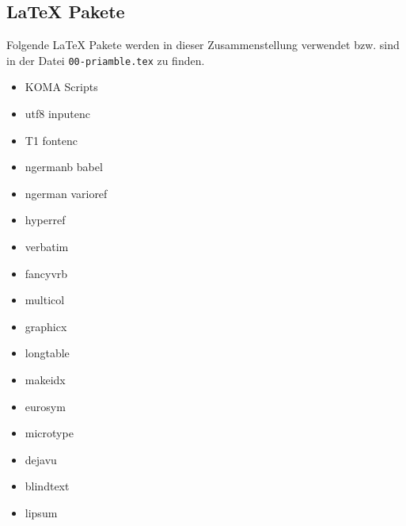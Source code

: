 \subsection{\LaTeX{} Pakete}
\label{ssec:latex-pakete}

Folgende \LaTeX{} Pakete werden in dieser Zusammenstellung verwendet
bzw. sind in der Datei \texttt{00-priamble.tex} zu finden.

\todo

\begin{itemize}
	\item KOMA Scripts
	\item utf8 inputenc
	\item T1 fontenc
	\item ngermanb babel
	\item ngerman varioref 
	\item hyperref
	\item verbatim
	\item fancyvrb
	\item multicol
	\item graphicx
	\item longtable
	\item makeidx
	\item eurosym
	\item microtype
	\item dejavu
	\item blindtext
	\item lipsum
\end{itemize}




